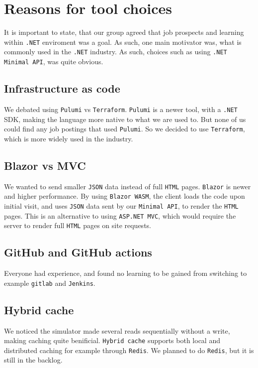 \section{Reasons for tool choices}
\label{appn:C}
It is important to state, that our group agreed that 
job prospects and learning within \texttt{.NET} enviroment was a goal.
As such, one main motivator was, what is commonly used in 
the \texttt{.NET} industry.
As such, choices such as using \texttt{.NET Minimal API},
was quite obvious.

\subsection{Infrastructure as code}

We debated using \texttt{Pulumi}\cite{pulumi} vs \texttt{Terraform}.
\texttt{Pulumi} is a newer tool, with a \texttt{.NET} SDK, 
making the language more native to what we are used to.
But none of us could find any job postings that used \texttt{Pulumi}.
So we decided to use \texttt{Terraform}, which is more widely used 
in the industry.


\subsection{Blazor vs MVC}
We wanted to send smaller \texttt{JSON} data instead of full \texttt{HTML} pages. 
\texttt{Blazor} is newer and higher performance. By using \texttt{Blazor WASM}, 
the client loads the code upon initial visit,
and uses \texttt{JSON} data sent by our \texttt{Minimal API}, to render the \texttt{HTML} pages.
This is an alternative to using \texttt{ASP.NET MVC}, which would require the server
to render full \texttt{HTML} pages on site requests.

\subsection{GitHub and GitHub actions}
Everyone had experience, and found no learning to be 
gained from switching to example \texttt{gitlab} and \texttt{Jenkins}.

\subsection{Hybrid cache}
We noticed the simulator made several reads sequentially without a write, 
making caching quite benificial. \texttt{Hybrid cache} supports both local 
and distributed caching for example through \texttt{Redis}\cite{redis}. 
We planned to do \texttt{Redis}, but it is still in the backlog.

